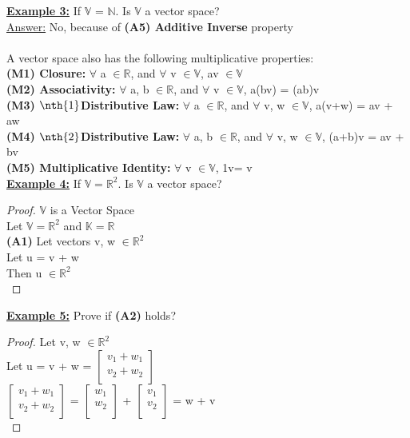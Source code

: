 \documentclass[12pt]{article}
\theoremstyle{definition}
\newcommand\tab[1][1.25cm]{\hspace*{#1}}
\def \R{\mathbb{R}}
\begin{document}
\textbf{\underline{Example 3:}} If $\mathbb{V}$ = $\mathbb{N}$. Is $\mathbb{V}$ a vector space?\\
\tab \underline{Answer:} No, because of \textbf{(A5) Additive Inverse} property\\\\

A vector space also has the following multiplicative properties:\\
\textbf{(M1) Closure: }$\forall$ a $\in \mathbb{R}$, and $\forall$ v $\in \mathbb{V}$, av $ \in \mathbb{V}$\\
\textbf{(M2) Associativity: }$\forall$ a, b $\in \mathbb{R}$, and $\forall$ v $\in \mathbb{V}$, a(bv) = (ab)v\\
\textbf{(M3) $\nth{1}$Distributive Law: }$\forall$ a $\in \mathbb{R}$, and $\forall$ v, w $\in \mathbb{V}$, a(v+w) = av + aw\\


\textbf{(M4) $\nth{2}$Distributive Law: }$\forall$ a, b $\in \mathbb{R}$, and $\forall$ v, w $\in \mathbb{V}$, (a+b)v = av + bv\\
\textbf{(M5) Multiplicative Identity: }$\forall$ v $\in \mathbb{V}$, 1v= v\\

\textbf{\underline{Example 4:}} If $\mathbb{V}= \R^2$. Is $\mathbb{V}$ a vector space?\\
\begin{proof}
	$\mathbb{V}$ is a Vector Space\\
	\tab Let  $\mathbb{V}= \R^2$ and $\mathbb{K}= \R$\\
	\tab \textbf{(A1)} Let vectors v, w  $\in \R^2$ \\
	\tab Let u = v + w\\
	\tab Then u $\in \R^2$\\	 

\end{proof}

\textbf{\underline{Example 5:}} Prove if \textbf{(A2)} holds?\\
\begin{proof} 
Let v, w $\in \R^2$\\
\tab Let u = v + w = $\begin{bmatrix}
v_{1} + w_1\\
v_{2} + w_2\\
\end{bmatrix}$\\
$\begin{bmatrix}
v_{1} + w_1\\
v_{2} + w_2\\
\end{bmatrix}$ = $\begin{bmatrix}
w_1\\
w_2\\
\end{bmatrix}$ + $\begin{bmatrix}
v_{1}\\
v_{2}\\
\end{bmatrix}$ = w + v\\
\end{proof}
\end{document}
